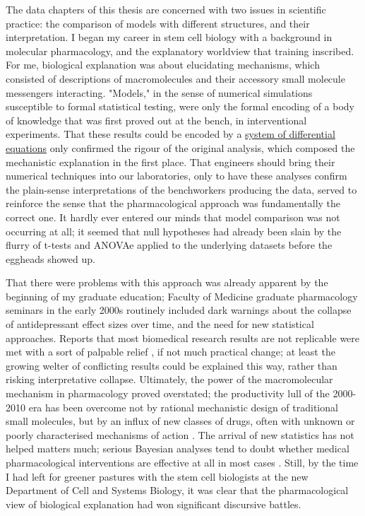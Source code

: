 The data chapters of this thesis are concerned with two issues in scientific practice: the comparison of models with different structures, and their interpretation. I began my career in stem cell biology with a background in molecular pharmacology, and the explanatory worldview that training inscribed. For me, biological explanation was about elucidating mechanisms, which consisted of descriptions of macromolecules and their accessory small molecule messengers interacting. "Models," in the sense of numerical simulations susceptible to formal statistical testing, were only the formal encoding of a body of knowledge that was first proved out at the bench, in interventional experiments. That these results could be encoded by a \hyperref[ssec:SODE]{system of differential equations} only confirmed the rigour of the original analysis, which composed the mechanistic explanation in the first place. That engineers should bring their numerical techniques into our laboratories, only to have these analyses confirm the plain-sense interpretations of the benchworkers producing the data, served to reinforce the sense that the pharmacological approach was fundamentally the correct one. It hardly ever entered our minds that model comparison was not occurring at all; it seemed that null hypotheses had already been slain by the flurry of t-tests and ANOVAe applied to the underlying datasets before the eggheads showed up.

That there were problems with this approach was already apparent by the beginning of my graduate education; Faculty of Medicine graduate pharmacology seminars in the early 2000s routinely included dark warnings about the collapse of antidepressant effect sizes over time, and the need for new statistical approaches. Reports that most biomedical research results are not replicable were met with a sort of palpable relief \cite{Ioannidis2005}, if not much practical change; at least the growing welter of conflicting results could be explained this way, rather than risking interpretative collapse. Ultimately, the power of the macromolecular mechanism in pharmacology proved overstated; the productivity lull of the 2000-2010 era has been overcome not by rational mechanistic design of traditional small molecules, but by an influx of new classes of drugs, often with unknown or poorly characterised mechanisms of action \cite{Munos2019}. The arrival of new statistics has not helped matters much; serious Bayesian analyses tend to doubt whether medical pharmacological interventions are effective at all in most cases \cite{Stegenga2018}. Still, by the time I had left for greener pastures with the stem cell biologists at the new Department of Cell and Systems Biology, it was clear that the pharmacological view of biological explanation had won significant discursive battles.

